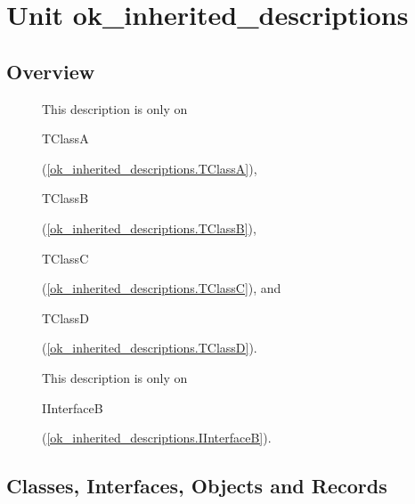 \documentclass{report}
\begin{document}
\newlength{\tmplength}
\chapter{Unit ok{\_}inherited{\_}descriptions}
\section{Overview}
\begin{description}
\item[\texttt{\begin{ttfamily}TClassA\end{ttfamily} Class}]This description is only on \begin{ttfamily}TClassA\end{ttfamily}(\ref{ok_inherited_descriptions.TClassA}), \begin{ttfamily}TClassB\end{ttfamily}(\ref{ok_inherited_descriptions.TClassB}), \begin{ttfamily}TClassC\end{ttfamily}(\ref{ok_inherited_descriptions.TClassC}), and \begin{ttfamily}TClassD\end{ttfamily}(\ref{ok_inherited_descriptions.TClassD}).
\item[\texttt{\begin{ttfamily}IInterfaceB\end{ttfamily} Interface}]This description is only on \begin{ttfamily}IInterfaceB\end{ttfamily}(\ref{ok_inherited_descriptions.IInterfaceB}).
\item[\texttt{\begin{ttfamily}TClassB\end{ttfamily} Class}]
\item[\texttt{\begin{ttfamily}IInterfaceC\end{ttfamily} Interface}]
\item[\texttt{\begin{ttfamily}TClassC\end{ttfamily} Class}]
\item[\texttt{\begin{ttfamily}TClassD\end{ttfamily} Class}]
\end{description}
\section{Classes, Interfaces, Objects and Records}
\end{document}
